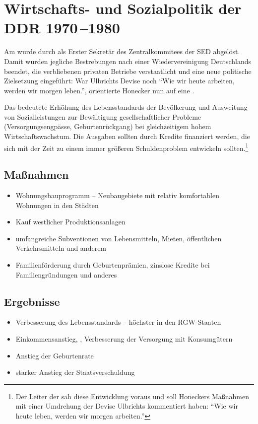 \section{Wirtschafts- und Sozialpolitik der DDR 1970\,--1980}

Am  wurde 
durch  als Erster Sekretär des
Zentralkommitees der SED abgelöst. Damit wurden jegliche Bestrebungen
nach einer Wiedervereinigung Deutschlands beendet, die verbliebenen
privaten Betriebe verstaatlicht und eine neue politische Zielsetzung
eingeführt: War Ulbrichts Devise noch \enquote{Wie wir heute arbeiten,
werden wir morgen leben.}, orientierte Honecker nun auf eine
.

Das bedeutete Erhöhung des Lebensstandards der Bevölkerung und
Ausweitung von Sozialleistungen zur Bewältigung gesellschaftlicher
Probleme (Versorgungsengpässe, Geburtenrückgang) bei gleichzeitigem
hohem Wirtschaftswachstum. Die Ausgaben sollten durch Kredite
finanziert werden, die sich mit der Zeit zu einem immer größeren
Schuldenproblem entwickeln sollten.\footnote{Der Leiter der
 sah diese Entwicklung
voraus und soll Honeckers Maßnahmen mit einer Umdrehung der Devise
Ulbrichts kommentiert haben: \enquote{Wie wir heute leben, werden wir
morgen arbeiten.}}

\subsection*{Maßnahmen}

\begin{itemize}
\item Wohnungsbauprogramm -- Neubaugebiete mit relativ komfortablen
Wohnungen in den Städten
\item Kauf westlicher Produktionsanlagen
\item umfangreiche Subventionen von Lebensmitteln, Mieten,
öffentlichen Verkehrsmitteln und anderem
\item Familienförderung durch Geburtenprämien, zinslose Kredite bei
Familiengründungen und anderes
\end{itemize}

\subsection*{Ergebnisse}

\begin{itemize}
\item Verbesserung des Lebensstandards -- höchster in den RGW-Staaten
\item Einkommensanstieg, , Verbesserung der
Versorgung mit Konsumgütern
\item Anstieg der Geburtenrate
\item starker Anstieg der Staatsverschuldung
\end{itemize}

\endinput
